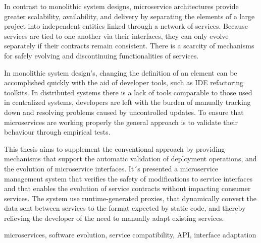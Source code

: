 
%

In contrast to monolithic system designs, microservice architectures provide greater scalability,
availability, and delivery by separating the elements of a large project into independent
entities linked through a network of services.
Because services are tied to one another via their interfaces, they can only evolve separately if their contracts remain consistent.
There is a scarcity of mechanisms for safely evolving and discontinuing functionalities of services.

In monolithic system design's, changing the definition of an element can be accomplished
quickly with the aid of developer tools, such as IDE refactoring toolkits.
In distributed systems there is a lack of tools comparable to those used in centralized systems, developers are left
with the burden of manually tracking down and resolving problems caused by uncontrolled updates.
To ensure that microservices are working properly the general approach is to validate their behaviour through empirical tests.

This thesis aims to supplement the conventional approach by providing mechanisms that
support the automatic validation of deployment operations, and the evolution of microservice interfaces.
It´s presented a microservice management system that verifies the safety of modifications to
service interfaces and that enables the evolution of service contracts without impacting consumer services.
The system use runtime-generated proxies, that dynamically convert the data sent between services to the format
expected by static code, and thereby relieving the developer of the need to manually adapt
existing services.

\begin{keywords}
    microservices, software evolution, service compatibility, API, interface adaptation
\end{keywords} 
